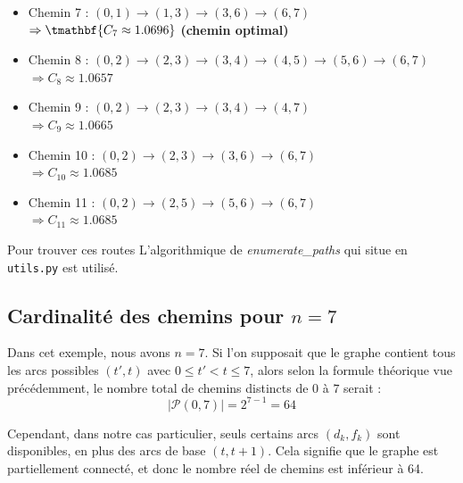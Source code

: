 \documentclass[a4paper,11pt]{article}
\begin{document}
\begin{itemize}
	\item Chemin 7 : $(0,1) \to (1,3) \to (3,6) \to (6,7)$ \\
	      \hspace{0.5cm} $\Rightarrow \tmathbf{C_7 \approx 1.0696}$ \textbf{(chemin optimal)}
	      \vspace{0.3cm}
	      
	\item Chemin 8 : $(0,2) \to (2,3) \to (3,4) \to (4,5) \to (5,6) \to (6,7)$ \\
	      \hspace{0.5cm} $\Rightarrow C_8 \approx 1.0657$
	      \vspace{0.3cm}
	      
	\item Chemin 9 : $(0,2) \to (2,3) \to (3,4) \to (4,7)$ \\
	      \hspace{0.5cm} $\Rightarrow C_9 \approx 1.0665$
	      \vspace{0.3cm}
	      
	\item Chemin 10 : $(0,2) \to (2,3) \to (3,6) \to (6,7)$ \\
	      \hspace{0.5cm} $\Rightarrow C_{10} \approx 1.0685$
	      \vspace{0.3cm}
	      
	\item Chemin 11 : $(0,2) \to (2,5) \to (5,6) \to (6,7)$ \\
	      \hspace{0.5cm} $\Rightarrow C_{11} \approx 1.0685$
	      \vspace{0.3cm}
\end{itemize}

Pour trouver ces routes L'algorithmique de \textit{enumerate\_paths} qui situe en \texttt{utils.py} est utilisé.


\subsection{Cardinalité des chemins pour $n = 7$}
Dans cet exemple, nous avons $n = 7$. Si l'on supposait que le graphe contient tous les arcs possibles $(t', t)$ avec $0 \leq t' < t \leq 7$, alors selon la formule théorique vue précédemment, le nombre total de chemins distincts de $0$ à $7$ serait :
\[
	|\mathcal{P}(0, 7)| = 2^{7 - 1} = 64
\]

Cependant, dans notre cas particulier, seuls certains arcs $(d_k, f_k)$ sont disponibles, en plus des arcs de base $(t, t+1)$. Cela signifie que le graphe est partiellement connecté, et donc le nombre réel de chemins est inférieur à 64.
\end{document}
